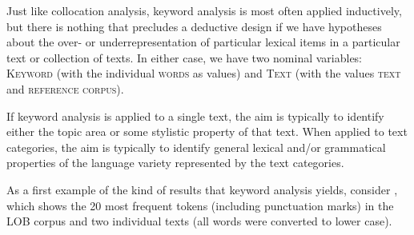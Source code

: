 Just like collocation  analysis, keyword  analysis is most often applied inductively,  but there is nothing that precludes a deductive  design  if we have hypotheses about the over- or underrepresentation of particular lexical items in a particular text or collection of texts. In either case, we have two nominal  variables: \textsc{Keyword} (with the individual \textsc{words} as values) and \textsc{Text} (with the values \textsc{text} and \textsc{reference corpus}).

If keyword  analysis is applied to a single text, the aim is typically to identify either the topic area or some stylistic  property of that text. When applied to text categories, the aim is typically to identify general lexical and\slash or grammatical  properties of the language variety  represented by the text categories.

As a first example of the kind of results that keyword  analysis yields, consider , which shows the 20 most frequent tokens  (including punctuation marks) in the LOB  corpus and two individual texts (all words were converted to lower case).\largerpage

